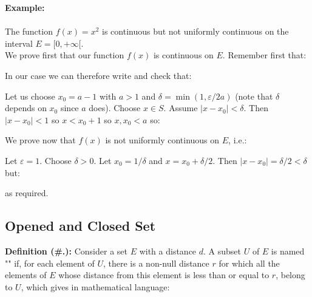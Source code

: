 	
	\begin{tcolorbox}[colframe=black,colback=white,sharp corners,breakable]
	\textbf{{\Large {}}Example:}\\\\
	The function $f(x) = x^2$ is continuous but not uniformly continuous
on the interval $E = [0,+\infty[$.\\

	We prove first that our function $f(x)$ is continuous on $E$. Remember first that:
	
	In our case we can therefore write and check that:
	
	
	Let us choose $x_0=a-1$ with $a>1$ and $\delta=\min(1,\varepsilon/2a)$ (note that $\delta$ depends on $x_0$ since $a$ does). Choose $x \in S$. Assume $|x-x_0|<\delta$. Then $|x-x_0|<1$ so $x<x_0+1$ so $x,x_0<a$ so:
	
	We prove now that $f(x)$ is not uniformly continuous on $E$, i.e.:
	
	Let $\varepsilon=1$. Choose $\delta>0$. Let $x_0=1/\delta$ and $x=x_0+\delta/2$. Then $|x-x_0|=\delta/2<\delta$ but:
	
	as required.
	\end{tcolorbox}
	
	\subsection{Opened and Closed Set}
	\textbf{Definition (\#\thesection.\mydef):} Consider a set $E$ with a distance $d$. A subset $U$ of $E$ is named "" if, for each element of $U$, there is a non-null distance $r$ for which all the elements of $E$ whose distance from this element is less than or equal to $r$, belong to $U$, which gives in mathematical language:
	
